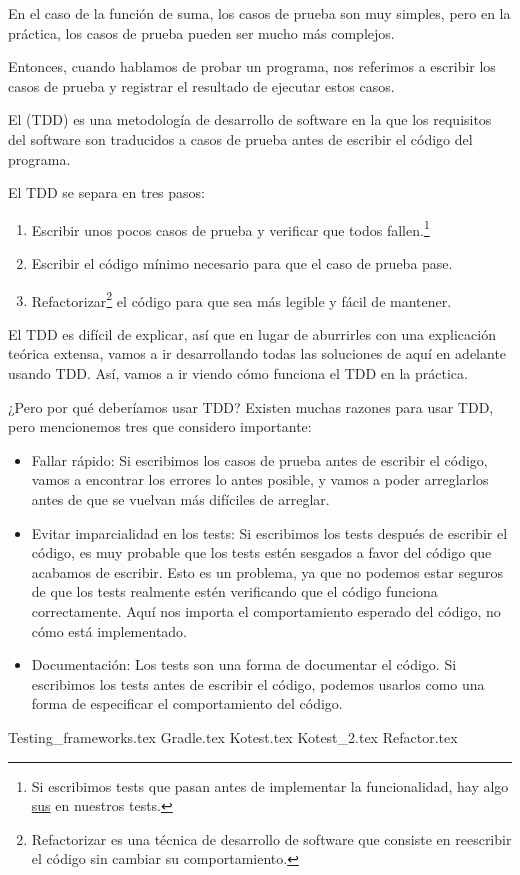   En el caso de la función de suma, los casos de prueba son muy simples, pero en la práctica, los
  casos de prueba pueden ser mucho más complejos.

  Entonces, cuando hablamos de probar un programa, nos referimos a escribir los casos de prueba y
  registrar el resultado de ejecutar estos casos.

  \begin{defaultbox}
    El  (TDD) es una metodología de desarrollo de software en la que
    los requisitos del software son traducidos a casos de prueba antes de escribir el código del
    programa.
  \end{defaultbox}

  El TDD se separa en tres pasos:

  \begin{enumerate}
    \item Escribir unos pocos casos de prueba y verificar que todos fallen.\footnote{
        Si escribimos tests que pasan antes de implementar la funcionalidad, hay algo 
        \href{https://www.merriam-webster.com/words-at-play/what-does-sus-mean}{sus} en nuestros 
        tests.
      }
    \item Escribir el código mínimo necesario para que el caso de prueba pase.
    \item Refactorizar\footnote{
      Refactorizar es una técnica de desarrollo de software que consiste en reescribir el código sin 
      cambiar su comportamiento.
    } el código para que sea más legible y fácil de mantener.
  \end{enumerate}

  El TDD es difícil de explicar, así que en lugar de aburrirles con una explicación teórica extensa,
  vamos a ir desarrollando todas las soluciones de aquí en adelante usando TDD.
  Así, vamos a ir viendo cómo funciona el TDD en la práctica.

  ¿Pero por qué deberíamos usar TDD?
  Existen muchas razones para usar TDD, pero mencionemos tres que considero importante:

  \begin{itemize}
    \item Fallar rápido: Si escribimos los casos de prueba antes de escribir el código, vamos a
      encontrar los errores lo antes posible, y vamos a poder arreglarlos antes de que se vuelvan
      más difíciles de arreglar.
    \item Evitar imparcialidad en los tests: Si escribimos los tests después de escribir el código,
      es muy probable que los tests estén sesgados a favor del código que acabamos de escribir.
      Esto es un problema, ya que no podemos estar seguros de que los tests realmente estén
      verificando que el código funciona correctamente.
      Aquí nos importa el comportamiento esperado del código, no cómo está implementado.
    \item Documentación: Los tests son una forma de documentar el código.
      Si escribimos los tests antes de escribir el código, podemos usarlos como una forma de
      especificar el comportamiento del código.
  \end{itemize}

  {Testing_frameworks.tex}
  {Gradle.tex}
  {Kotest.tex}
  {Kotest_2.tex}
  {Refactor.tex}

  \printbibliography[keyword=tdd]